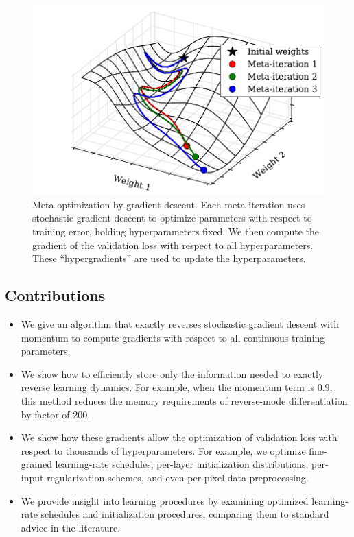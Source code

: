 \documentclass{article}
\begin{document}
\begin{figure}[t]
\vskip 0.2in
\begin{center}
\includegraphics[width=\columnwidth]{../experiments/Jan_25_Figure_1/2/learning_curves.pdf}
\caption{Meta-optimization by gradient descent.
Each meta-iteration uses stochastic gradient descent to optimize parameters with respect to training error, holding hyperparameters fixed.
We then compute the gradient of the validation loss with respect to all hyperparameters.
These ``hypergradients'' are used to update the hyperparameters.}
\label{fig:chaos}
\end{center}
\vskip -0.2in
\end{figure}

\subsection{Contributions}

\begin{itemize}
\item We give an algorithm that exactly reverses stochastic gradient descent with momentum to compute gradients with respect to all continuous training parameters.
\item We show how to efficiently store only the information needed to exactly reverse learning dynamics.
For example, when the momentum term is 0.9, this method reduces the memory requirements of reverse-mode differentiation by factor of 200.
\item We show how these gradients allow the optimization of validation loss with respect to thousands of hyperparameters.
For example, we optimize fine-grained learning-rate schedules, per-layer initialization distributions, per-input regularization schemes, and even per-pixel data preprocessing.
\item We provide insight into learning procedures by examining optimized learning-rate schedules and initialization procedures, comparing them to standard advice in the literature.
\end{itemize}
\end{document}
